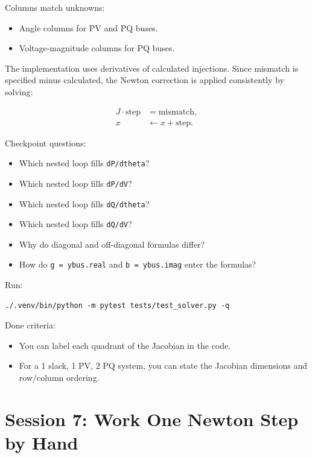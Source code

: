 \documentclass[11pt]{article}
\newcommand{\code}[1]{\texttt{#1}}
\begin{document}
Columns match unknowns:

\begin{itemize}
  \item Angle columns for PV and PQ buses.
  \item Voltage-magnitude columns for PQ buses.
\end{itemize}

The implementation uses derivatives of calculated injections. Since mismatch is
specified minus calculated, the Newton correction is applied consistently by
solving:

\begin{align*}
J \cdot \mathrm{step} &= \mathrm{mismatch}, \\
x &\leftarrow x + \mathrm{step}.
\end{align*}

Checkpoint questions:

\begin{itemize}
  \item Which nested loop fills \code{dP/dtheta}?
  \item Which nested loop fills \code{dP/dV}?
  \item Which nested loop fills \code{dQ/dtheta}?
  \item Which nested loop fills \code{dQ/dV}?
  \item Why do diagonal and off-diagonal formulas differ?
  \item How do \code{g = ybus.real} and \code{b = ybus.imag} enter the
  formulas?
\end{itemize}

Run:

\begin{verbatim}
./.venv/bin/python -m pytest tests/test_solver.py -q
\end{verbatim}

Done criteria:

\begin{itemize}
  \item You can label each quadrant of the Jacobian in the code.
  \item For a 1 slack, 1 PV, 2 PQ system, you can state the Jacobian dimensions
  and row/column ordering.
\end{itemize}

\section{Session 7: Work One Newton Step by Hand}
\end{document}
